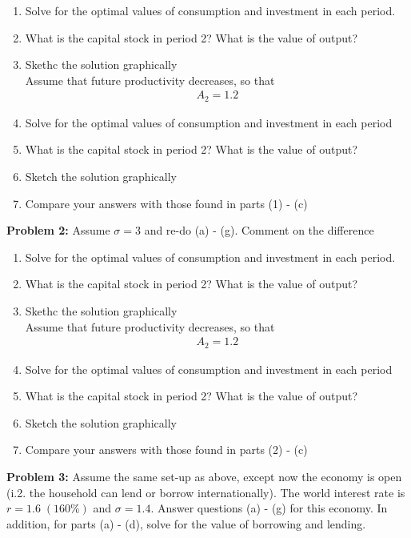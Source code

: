 \documentclass[11pt]{SelfArxOneColBMN}
\begin{document}
\begin{enumerate}[label=(\alph*)]
    \item Solve for the optimal values of consumption and investment in each period.
    \item What is the capital stock in period 2? What is the value of output?
    \item Skethc the solution graphically\\
    Assume that future productivity decreases, so that
    \begin{eqnarray*}
        A_2 = 1.2
    \end{eqnarray*}
    \item Solve for the optimal values of consumption and investment in each period
    \item What is the capital stock in period 2? What is the value of output?
    \item Sketch the solution graphically
    \item Compare your answers with those found in parts (1) - (c)
\end{enumerate}

\textbf{Problem 2: }Assume $\sigma = 3$ and re-do (a) - (g). Comment on the difference\\
\begin{enumerate}[label=(\alph*)]
    \item Solve for the optimal values of consumption and investment in each period.
    \item What is the capital stock in period 2? What is the value of output?
    \item Skethc the solution graphically\\
    Assume that future productivity decreases, so that
    \begin{eqnarray*}
        A_2 = 1.2
    \end{eqnarray*}
    \item Solve for the optimal values of consumption and investment in each period
    \item What is the capital stock in period 2? What is the value of output?
    \item Sketch the solution graphically
    \item Compare your answers with those found in parts (2) - (c)
\end{enumerate}

\textbf{Problem 3: }Assume the same set-up as above, except now the economy is open (i.2. the household can lend or borrow internationally). The world interest rate is $r = 1.6 \; (160\%)$ and $\sigma = 1.4$. Answer questions (a) - (g) for this economy. In addition, for parts (a) - (d), solve for the value of borrowing and lending. 

\end{document}
